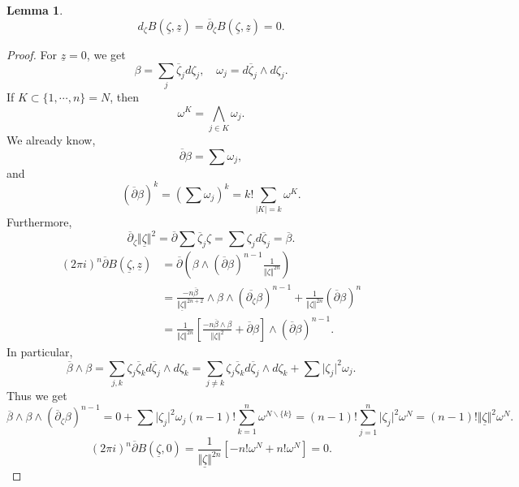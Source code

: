 \documentclass{article}
\newtheorem{lemma}{Lemma}[section]
\newcommand{\norm}[1]{\Vert #1 \Vert}
\newcommand{\bd}[0]{\partial}
\newcommand{\mzeta}[0]{\underline{\zeta}}
\newcommand{\mz}[0]{\underline{z}}
\newcommand{\czeta}[0]{\overline{\zeta}}
\begin{document}
\begin{lemma}
\begin{equation*}
  d_\zeta B(\mzeta, \mz) = \overline{\bd}_\zeta B(\mzeta,\mz) = 0.
\end{equation*}
\end{lemma}
\begin{proof}
  For $\mz=0$, we get 
  \begin{equation*}
    \beta = \sum_j \czeta_j d\zeta_j,\quad \omega_j = d\czeta_j\wedge d\zeta_j.
  \end{equation*}
  If $K\subset\{1,\cdots,n\}=N$, then 
  \begin{equation*}
    \omega^K = \bigwedge_{j\in K}\omega_j.
  \end{equation*}
  We already know,
  \begin{equation*}
    \overline{\bd}\beta = \sum \omega_j,
  \end{equation*}
  and 
  \begin{equation*}
    (\overline{\bd}\beta)^k = \left(\sum \omega_j\right)^k = k!\sum_{|K|=k}\omega^K.
  \end{equation*}
  Furthermore,
  \begin{equation*}
    \overline{\bd}_\zeta\norm{\mzeta}^2 = \overline{\bd}\sum \czeta_j\zeta = \sum \zeta_j d\czeta_j = \overline{\beta}. 
  \end{equation*}
  \begin{align*}
    (2\pi i)^n\overline{\bd}B(\mzeta,\mz) &= \overline{\bd}\left(\beta\wedge(\overline{\bd}\beta)^{n-1}{\frac 1 {\norm{\zeta}^{2n}}}\right)\\
    & = {\frac {-n\overline{\beta}} {\norm{\mzeta}^{2n+2}}}\wedge\beta\wedge(\overline{\bd_\zeta}\beta)^{n-1}+{\frac 1 {\norm{\zeta}^{2n}}}(\overline{\partial}\beta)^n\\
    & = {\frac 1 {\norm{\zeta}^{2n}}}\left[{\frac {-n\overline{\beta}\wedge\beta} {\norm{\zeta}^2}}+\overline{\partial}\beta\right]\wedge(\overline{\bd}\beta)^{n-1}.
  \end{align*}
  In particular,
  \begin{equation*}
    \overline{\beta}\wedge\beta = \sum_{j,k}\zeta_j\czeta_k d\czeta_j\wedge d\zeta_k = \sum_{j\not=k}\zeta_j\czeta_kd\czeta_j \wedge d\zeta_k+\sum \vert\zeta_j\vert^2\omega_j.
  \end{equation*}
  Thus we get 
  \begin{equation*}
    \overline{\beta}\wedge\beta\wedge(\overline{\bd}_\zeta\beta)^{n-1} = 0+\sum \vert\zeta_j\vert^2\omega_j(n-1)!\sum_{k=1}^n\omega^{N\backslash\{k\}}=(n-1)!\sum_{j=1}^n\vert\zeta_j\vert^2\omega^N = (n-1)!\norm{\mzeta}^2\omega^N.
  \end{equation*}
  \begin{equation*}
    (2\pi i)^n\overline{\bd}B(\mzeta,0) = {\frac 1 {\norm{\mzeta}^{2n}}}\left[-n!\omega^N+n!\omega^N\right] = 0.
  \end{equation*}
\end{proof}
\end{document}
